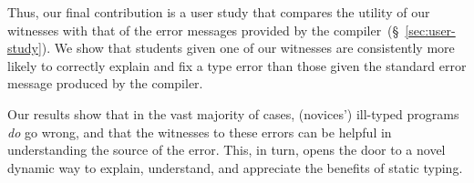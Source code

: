 Thus, our final contribution is a user study that compares the utility
of our witnesses with that of the error messages provided by the \ocaml
compiler~(\S~\ref{sec:user-study}).
%
We show that students given one of our witnesses are consistently more
likely to correctly explain and fix a type error than those given
the standard error message produced by the \ocaml compiler.

\smallskip
Our results show that in the vast majority of
cases, (novices') ill-typed programs \emph{do} go wrong,
and that the witnesses to these errors can be helpful in
understanding the source of the error.
%
This, in turn, opens the door to a novel dynamic way to
explain, understand, and appreciate the benefits of static typing.


